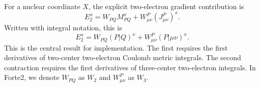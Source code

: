 \documentclass[aip,preprint]{revtex4-1}
\newcommand{\df}{\mathrm{DF}}
\newcommand{\pert}{x}
\begin{document}
For a nuclear coordinate $X$, the explicit two-electron gradient contribution is
\begin{equation}
E_2^{\pert}
=
W_{PQ} M^{\pert}_{PQ}
+
W^P_{\mu\nu} (J^{P}_{\mu\nu})^{\pert}
.
\label{eq:e2_gradient_final_ao}
\end{equation}
Written with integral notation, this is
\begin{equation}
E_2^{\pert}
=
W_{PQ} (P|Q)^{\pert}
+
W^P_{\mu\nu} (P|\mu\nu)^{\pert}
.
\label{eq:e2_gradient_integral_notation}
\end{equation}
This is the central result for implementation.  The first requires the
first derivatives of two-center two-electron Coulomb metric integrals.
The second contraction requires the first derivatives of three-center two-electron integrals.
In Forte2, we denote $W_{PQ}$ as $W_2$ and $W^P_{\mu\nu}$ as $W_3$.

%
\end{document}
